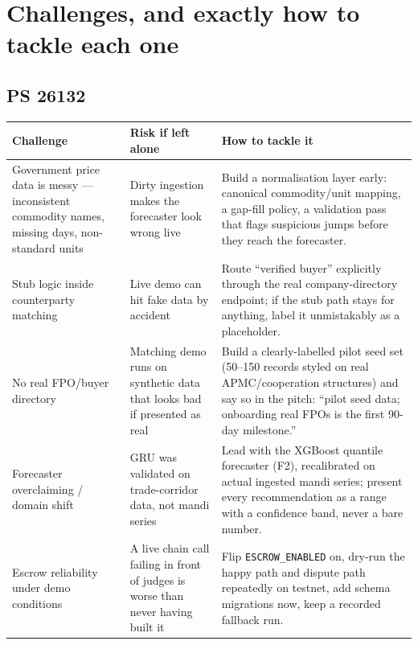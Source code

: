 \documentclass[11pt]{article}
\begin{document}
\clearpage
\section{Challenges, and exactly how to tackle each one}

\subsection*{PS 26132}
\renewcommand{\arraystretch}{1.35}
\begin{longtable}{@{}p{3.7cm}p{4.1cm}p{7.0cm}@{}}
\toprule
\textbf{Challenge} & \textbf{Risk if left alone} & \textbf{How to tackle it} \\
\midrule
\endhead
Government price data is messy --- inconsistent commodity names, missing days, non-standard units & Dirty
ingestion makes the forecaster look wrong live & Build a normalisation layer early: canonical
commodity/unit mapping, a gap-fill policy, a validation pass that flags suspicious jumps before they reach
the forecaster. \\[0.4em]
Stub logic inside counterparty matching & Live demo can hit fake data by accident & Route ``verified
buyer'' explicitly through the real company-directory endpoint; if the stub path stays for anything, label
it unmistakably as a placeholder. \\[0.4em]
No real FPO/buyer directory & Matching demo runs on synthetic data that looks bad if presented as real &
Build a clearly-labelled pilot seed set (50--150 records styled on real APMC/cooperation structures) and
say so in the pitch: ``pilot seed data; onboarding real FPOs is the first 90-day milestone.'' \\[0.4em]
Forecaster overclaiming / domain shift & GRU was validated on trade-corridor data, not mandi series &
Lead with the XGBoost quantile forecaster (F2), recalibrated on actual ingested mandi series; present every
recommendation as a range with a confidence band, never a bare number. \\[0.4em]
Escrow reliability under demo conditions & A live chain call failing in front of judges is worse than never
having built it & Flip \texttt{ESCROW\_ENABLED} on, dry-run the happy path and dispute path repeatedly on
testnet, add schema migrations now, keep a recorded fallback run. \\
\bottomrule
\end{longtable}
\end{document}
